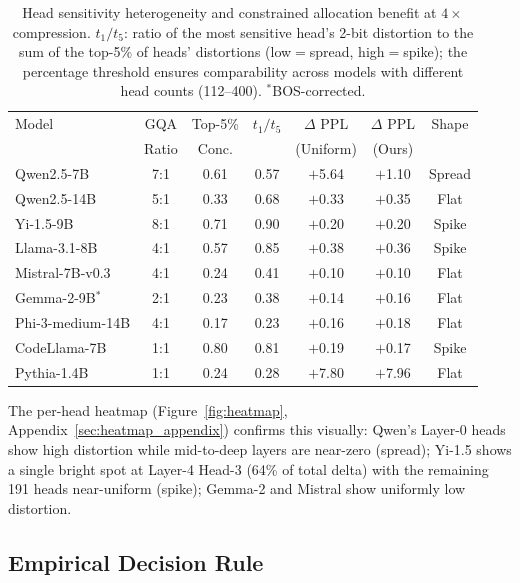 \begin{table}[t]
\centering
\small
\caption{Head sensitivity heterogeneity and constrained allocation benefit at $4\times$ compression. $t_1/t_5$: ratio of the most sensitive head's 2-bit distortion to the sum of the top-5\% of heads' distortions (low${=}$spread, high${=}$spike); the percentage threshold ensures comparability across models with different head counts (112--400). $^*$BOS-corrected.}
\label{tab:heterogeneity}
\begin{tabular}{lcccccc}
\toprule
Model & GQA & Top-5\% & $t_1/t_5$ & $\Delta$ PPL & $\Delta$ PPL & Shape \\
 & Ratio & Conc. & & (Uniform) & (Ours) & \\
\midrule
Qwen2.5-7B & 7:1 & 0.61 & 0.57 & $+$5.64 & $+$1.10 & Spread \\
Qwen2.5-14B & 5:1 & 0.33 & 0.68 & $+$0.33 & $+$0.35 & Flat \\
Yi-1.5-9B & 8:1 & 0.71 & 0.90 & $+$0.20 & $+$0.20 & Spike \\
Llama-3.1-8B & 4:1 & 0.57 & 0.85 & $+$0.38 & $+$0.36 & Spike \\
Mistral-7B-v0.3 & 4:1 & 0.24 & 0.41 & $+$0.10 & $+$0.10 & Flat \\
Gemma-2-9B$^*$ & 2:1 & 0.23 & 0.38 & $+$0.14 & $+$0.16 & Flat \\
Phi-3-medium-14B & 4:1 & 0.17 & 0.23 & $+$0.16 & $+$0.18 & Flat \\
CodeLlama-7B & 1:1 & 0.80 & 0.81 & $+$0.19 & $+$0.17 & Spike \\
Pythia-1.4B & 1:1 & 0.24 & 0.28 & $+$7.80 & $+$7.96 & Flat \\
\bottomrule
\end{tabular}
\end{table}

The per-head heatmap (Figure~\ref{fig:heatmap}, Appendix~\ref{sec:heatmap_appendix}) confirms this visually: Qwen's Layer-0 heads show high distortion while mid-to-deep layers are near-zero (spread); Yi-1.5 shows a single bright spot at Layer-4 Head-3 (64\% of total delta) with the remaining 191 heads near-uniform (spike); Gemma-2 and Mistral show uniformly low distortion.

\subsection{Empirical Decision Rule}
\label{sec:diagnostic}

